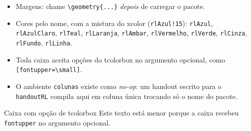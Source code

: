 \documentclass[a4paper, 11pt]{extarticle}
\begin{document}


\begin{itemize}
  \item Margens: chame \texttt{\textbackslash geometry\{...\}} \emph{depois} de
        carregar o pacote.
  \item Cores pelo nome, com a mistura do xcolor (\texttt{rlAzul!15}):
        \texttt{rlAzul}, \texttt{rlAzulClaro}, \texttt{rlTeal},
        \texttt{rlLaranja}, \texttt{rlAmbar}, \texttt{rlVermelho},
        \texttt{rlVerde}, \texttt{rlCinza}, \texttt{rlFundo},
        \texttt{rlLinha}.
  \item Toda caixa aceita opções do tcolorbox no argumento opcional, como
        \texttt{[fontupper=\textbackslash small]}.
  \item O ambiente \texttt{colunas} existe como \emph{no-op}: um handout escrito
        para o \texttt{handoutRL} compila aqui em coluna única trocando só o
        nome do pacote.
\end{itemize}

\begin{teobox}[fontupper=\small]{Caixa com opção de tcolorbox}
  Este texto está menor porque a caixa recebeu \texttt{fontupper} no argumento
  opcional.
\end{teobox}
\end{document}
